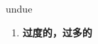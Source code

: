 
\begin{frame}
{\huge undue}
\begin{center}
\begin{enumerate}\Large
  \item \textbf{过度的，过多的}
\end{enumerate}
\end{center}
\end{frame}
